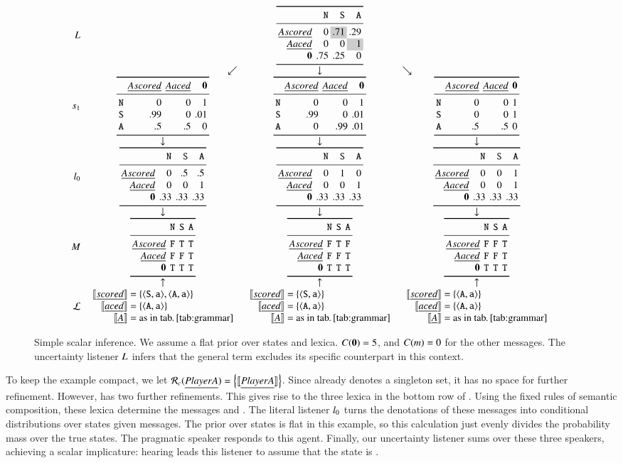 \documentclass[leqno,12pt]{article}
\begin{document}
\begin{figure}[!t]
  \[
  \setlength{\arraycolsep}{4pt}
  \begin{array}{r c c c}
    \UncertaintyListener &
    & \genericscalar{0}{\graycell{.71}}{.29}{0}{0}{\graycell{1}}{.75}{.25}{0}
    \\
    & \multicolumn{1}{r}{\swarrow}& \multicolumn{1}{c}{\downarrow}& \multicolumn{1}{l}{\searrow}
    \\
    \speakerOne
    &
    \scalarspeaker{0}{0}{1}{.99}{0}{.01}{.5}{.5}{0}
    &
    \scalarspeaker{0}{0}{1}{.99}{0}{.01}{0}{.99}{.01}
    &
    \scalarspeaker{0}{0}{1}{0}{0}{1}{.5}{.5}{0}
    \\
    & \downarrow & \downarrow & \downarrow
    \\
    \listenerZero
    &
    \genericscalar{0}{.5}{.5}{0}{0}{1}{.33}{.33}{.33}
    &
    \genericscalar{0}{1}{0}{0}{0}{1}{.33}{.33}{.33}
    &
    \genericscalar{0}{0}{1}{0}{0}{1}{.33}{.33}{.33}
    \\
    & \downarrow & \downarrow & \downarrow 
    \\    
    \Messages
    &
    \genericscalar{\False}{\True}{\True}{\False}{\False}{\True}{\True}{\True}{\True}
    &
    \genericscalar{\False}{\True}{\False}{\False}{\False}{\True}{\True}{\True}{\True}
    &
    \genericscalar{\False}{\False}{\True}{\False}{\False}{\True}{\True}{\True}{\True}
    \\
    & \uparrow & \uparrow & \uparrow 
    \\                               
    \Lex
    & 
    \scalarlex{\tuple{\world{S},\playera}, \tuple{\world{A},\playera}}
    & 
    \scalarlex{\tuple{\world{S},\playera}}
    &
    \scalarlex{\tuple{\world{A},\playera}}   
  \end{array}
  \]
  \caption{Simple scalar inference. 
    We assume a flat prior over states and lexica. 
    $C(\mathbf{0}) = 5$, and $C(m) = 0$ for the other messages. 
    The uncertainty listener $L$ infers that the general term 
     excludes its specific counterpart  in this context.}
  \label{fig:simplescalar}
\end{figure}

To keep the example compact, we let
$\mathcal{R}_{c}(\emph{Player A}) = \left\{ \llbracket\emph{Player A}\rrbracket \right\}$. Since
 already denotes a singleton set, it has no space for
further refinement. However,  has two further
refinements. This gives rise to the three lexica in the bottom row of
.  Using the fixed rules of semantic
composition, these lexica determine the messages  and . The literal listener
$l_{0}$ turns the denotations of these messages into
conditional distributions over states given messages. The prior over
states is flat in this example, so this calculation just evenly
divides the probability mass over the true states. The pragmatic
speaker responds to this agent. Finally, our uncertainty listener sums
over these three speakers, achieving a scalar implicature: hearing
 leads this listener to assume that the state is
.
\end{document}
